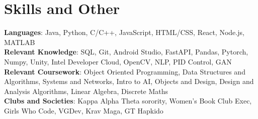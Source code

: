\documentclass[letterpaper,11pt]{article}
\begin{document}
\section{Skills and Other}
 \begin{itemize}[leftmargin=0.15in, label={}]
    \small{\item{
     \textbf{Languages}{: Java, Python, C/C++, JavaScript, HTML/CSS, React, Node.js, MATLAB} \\
     \textbf{Relevant Knowledge}{: SQL, Git, Android Studio, FastAPI, Pandas, Pytorch, Numpy, Unity, Intel Developer Cloud, OpenCV, NLP, PID Control, GAN} \\
     \textbf{Relevant Coursework}: Object Oriented Programming, Data Structures and Algorithms, Systems and Networks, Intro to AI, Objects and Design, Design and Analysis Algorithms, Linear Algebra, Discrete Maths}\\
     \textbf{Clubs and Societies}: Kappa Alpha Theta sorority, Women's Book Club Exec, Girls Who Code, VGDev, Krav Maga, GT Hapkido}
 \end{itemize}


\end{document}
